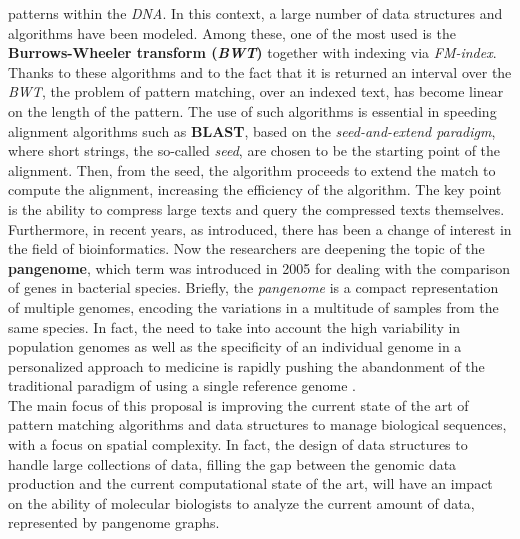 \documentclass[a4paper,11pt, oneside]{article}
\newcommand{\pb}[1]{\todo[backgroundcolor=red]{\textbf{PB} #1}}
\newcommand{\dc}[1]{\todo[[backgroundcolor=yellow]{\textbf{DC} #1}}
\begin{document}
patterns within the \textit{DNA}. 
In this context, a large number of data structures and algorithms have been
modeled. Among these, one of the most used is the \textbf{Burrows-Wheeler
  transform (\textit{BWT})} together with indexing via \textit{FM-index}. Thanks
to these algorithms and to the fact that it is returned an interval over the
\textit{BWT}, the problem of pattern matching, over an indexed text, has become 
linear on the length of the pattern. The
use of such 
algorithms is essential in speeding alignment algorithms such as
\textbf{BLAST}, based on the \textit{seed-and-extend paradigm}, where short
strings, the so-called \textit{seed}, are chosen to be the starting point of
the alignment. Then, from the seed, the algorithm proceeds to extend the match
to compute the alignment, increasing the efficiency of the
algorithm. The key point is the ability to compress large texts and query the
compressed texts themselves.\\  
Furthermore, in recent years, as introduced, there has been a change of interest
in the field of bioinformatics. Now the 
researchers are deepening the topic of the \textbf{pangenome}, which
term was introduced
in 2005 for dealing with the comparison of genes in
bacterial species. Briefly, the \textit{pangenome} is a compact 
representation of multiple genomes, encoding the variations in a multitude of
samples from the same species. In fact, the need to take into 
account the high variability in population genomes as well as the specificity of
an individual genome in a personalized approach to medicine is rapidly pushing
the abandonment of the traditional paradigm of using a single reference genome
\cite{pancon}. \\
The main focus of this proposal is improving the current state of the art
of pattern matching algorithms and data structures to manage biological
sequences, with a focus on spatial 
complexity. In fact, the design of data structures to handle large
collections of data, filling the gap between the genomic data production and the
current computational state of the art, will have an impact on the ability of
molecular biologists to analyze the current amount of data, represented by
pangenome graphs. 
\end{document}
